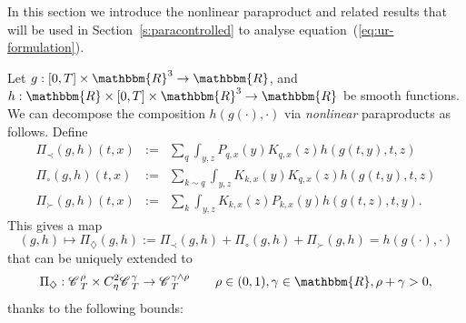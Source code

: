 \documentclass[11pt,reqno]{amsart}
\newcommand{\assign}{:=}
\newcommand{\cdummy}{\cdot}
\newcommand{\nocomma}{}
\newcommand{\tmtextit}[1]{{\itshape{#1}}}
\newcommand{\CC}{\mathscr{C} \hspace{.1em}}
\begin{document}
In this section we introduce the nonlinear paraproduct and related results
that will be used in Section~\ref{s:paracontrolled} to analyse
equation~(\ref{eq:ur-formulation}).

Let $g : [0, T] \times \mathbbm{R}^3 \rightarrow \mathbbm{R}$, and $h :
\mathbbm{R} \times [0, T] \times \mathbbm{R}^3 \rightarrow \mathbbm{R}$ be
smooth functions. We can decompose the composition $h (g (\cdummy), \cdummy)$
via \tmtextit{nonlinear} paraproducts as follows. Define
\begin{eqnarray}
  \Pi_{\prec} (g, h) (t, x) & \assign & \sum_q \int_{y, z} P_{q, x} (y) K_{q,
  x} (z) h (g (t, y), t, z)  \label{e:nonlin-par-small}\\
  \Pi_{\circ} (g, h) (t, x) & \assign & \sum_{k \sim q} \int_{y, z} K_{k, x}
  (y) K_{q, x} (z) h (g (t, y), t, z)  \label{e:nonlin-par-same}\\
  \Pi_{\succ} (g, h) (t, x) & \assign & \sum_k \int_{y, z} K_{k, x} (z) P_{k,
  x} (y) h (g (t, z), t, y) .  \label{e:nonlin-par-big}
\end{eqnarray}
This gives a map
\begin{equation}
  (g, h) \mapsto \Pi_{\nocomma \diamondsuit} (g, h) \assign \Pi_{\prec} (g, h)
  + \Pi_{\circ} (g, h) + \Pi_{\succ} (g, h) = h (g (\cdot), \cdot) 
  \label{e:nonlin-decomp}
\end{equation}
that can be uniquely extended to
\[ \Pi_{\diamondsuit} : \CC_T^{\rho} \times C^2_{\eta} \CC_T^{\gamma}
   \rightarrow \CC_T^{\gamma \wedge \rho} \qquad \rho \in (0, 1), \gamma \in
   \mathbbm{R}, \rho + \gamma > 0, \]
thanks to the following bounds:
\end{document}
